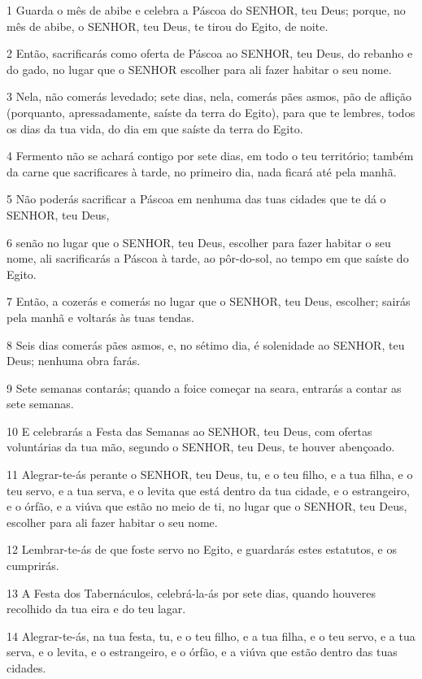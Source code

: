 \par 1 Guarda o mês de abibe e celebra a Páscoa do SENHOR, teu Deus; porque, no mês de abibe, o SENHOR, teu Deus, te tirou do Egito, de noite.
\par 2 Então, sacrificarás como oferta de Páscoa ao SENHOR, teu Deus, do rebanho e do gado, no lugar que o SENHOR escolher para ali fazer habitar o seu nome.
\par 3 Nela, não comerás levedado; sete dias, nela, comerás pães asmos, pão de aflição (porquanto, apressadamente, saíste da terra do Egito), para que te lembres, todos os dias da tua vida, do dia em que saíste da terra do Egito.
\par 4 Fermento não se achará contigo por sete dias, em todo o teu território; também da carne que sacrificares à tarde, no primeiro dia, nada ficará até pela manhã.
\par 5 Não poderás sacrificar a Páscoa em nenhuma das tuas cidades que te dá o SENHOR, teu Deus,
\par 6 senão no lugar que o SENHOR, teu Deus, escolher para fazer habitar o seu nome, ali sacrificarás a Páscoa à tarde, ao pôr-do-sol, ao tempo em que saíste do Egito.
\par 7 Então, a cozerás e comerás no lugar que o SENHOR, teu Deus, escolher; sairás pela manhã e voltarás às tuas tendas.
\par 8 Seis dias comerás pães asmos, e, no sétimo dia, é solenidade ao SENHOR, teu Deus; nenhuma obra farás.
\par 9 Sete semanas contarás; quando a foice começar na seara, entrarás a contar as sete semanas.
\par 10 E celebrarás a Festa das Semanas ao SENHOR, teu Deus, com ofertas voluntárias da tua mão, segundo o SENHOR, teu Deus, te houver abençoado.
\par 11 Alegrar-te-ás perante o SENHOR, teu Deus, tu, e o teu filho, e a tua filha, e o teu servo, e a tua serva, e o levita que está dentro da tua cidade, e o estrangeiro, e o órfão, e a viúva que estão no meio de ti, no lugar que o SENHOR, teu Deus, escolher para ali fazer habitar o seu nome.
\par 12 Lembrar-te-ás de que foste servo no Egito, e guardarás estes estatutos, e os cumprirás.
\par 13 A Festa dos Tabernáculos, celebrá-la-ás por sete dias, quando houveres recolhido da tua eira e do teu lagar.
\par 14 Alegrar-te-ás, na tua festa, tu, e o teu filho, e a tua filha, e o teu servo, e a tua serva, e o levita, e o estrangeiro, e o órfão, e a viúva que estão dentro das tuas cidades.
